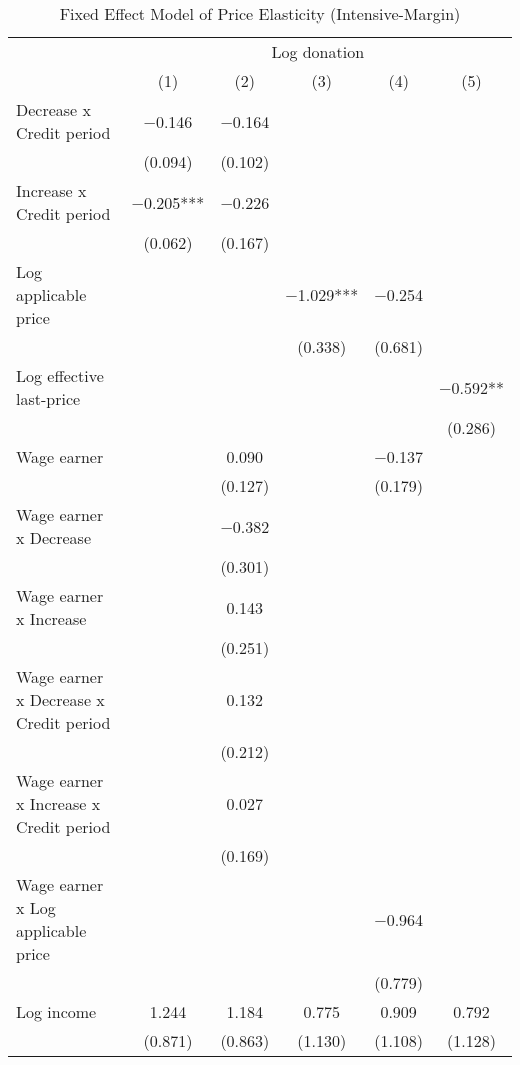 \begin{table}

\caption{Fixed Effect Model of Price Elasticity (Intensive-Margin)\label{tab:fe-model-int}}
\centering
\fontsize{8}{10}\selectfont
\begin{threeparttable}
\begin{tabular}[t]{lccccc}
\toprule
\multicolumn{1}{c}{ } & \multicolumn{5}{c}{Log donation} \\
\cmidrule(l{3pt}r{3pt}){2-6}
  & (1) & (2) & (3) & (4) & (5)\\
\midrule
Decrease x Credit period & \num{-0.146} & \num{-0.164} &  &  & \\
 & (\num{0.094}) & (\num{0.102}) &  &  & \\
Increase x Credit period & \num{-0.205}*** & \num{-0.226} &  &  & \\
 & (\num{0.062}) & (\num{0.167}) &  &  & \\
Log applicable price &  &  & \num{-1.029}*** & \num{-0.254} & \\
 &  &  & (\num{0.338}) & (\num{0.681}) & \\
Log effective last-price &  &  &  &  & \num{-0.592}**\\
 &  &  &  &  & (\num{0.286})\\
Wage earner &  & \num{0.090} &  & \num{-0.137} & \\
 &  & (\num{0.127}) &  & (\num{0.179}) & \\
Wage earner x Decrease &  & \num{-0.382} &  &  & \\
 &  & (\num{0.301}) &  &  & \\
Wage earner x Increase &  & \num{0.143} &  &  & \\
 &  & (\num{0.251}) &  &  & \\
Wage earner x Decrease x Credit period &  & \num{0.132} &  &  & \\
 &  & (\num{0.212}) &  &  & \\
Wage earner x Increase x Credit period &  & \num{0.027} &  &  & \\
 &  & (\num{0.169}) &  &  & \\
Wage earner x Log applicable price &  &  &  & \num{-0.964} & \\
 &  &  &  & (\num{0.779}) & \\
Log income & \num{1.244} & \num{1.184} & \num{0.775} & \num{0.909} & \num{0.792}\\
 & (\num{0.871}) & (\num{0.863}) & (\num{1.130}) & (\num{1.108}) & (\num{1.128})\\
\midrule

\end{tabular}
\end{threeparttable}
\end{table}
